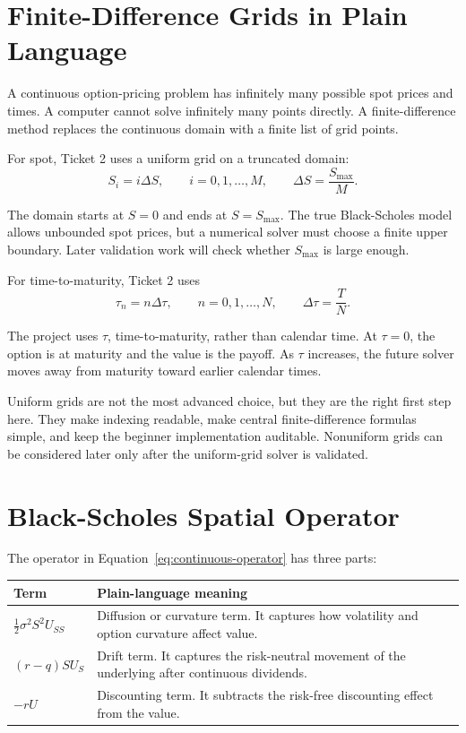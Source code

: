 \documentclass[11pt,a4paper]{article}
\begin{document}
\section{Finite-Difference Grids in Plain Language}

A continuous option-pricing problem has infinitely many possible spot prices and times. A
computer cannot solve infinitely many points directly. A finite-difference method replaces the
continuous domain with a finite list of grid points.

For spot, Ticket 2 uses a uniform grid on a truncated domain:
\begin{equation}
  S_i = i\Delta S,\qquad i = 0,1,\ldots,M,
  \qquad
  \Delta S = \frac{S_{\max}}{M}.
\end{equation}

The domain starts at \(S=0\) and ends at \(S=S_{\max}\). The true Black-Scholes model allows
unbounded spot prices, but a numerical solver must choose a finite upper boundary. Later
validation work will check whether \(S_{\max}\) is large enough.

For time-to-maturity, Ticket 2 uses
\begin{equation}
  \tau_n = n\Delta \tau,\qquad n = 0,1,\ldots,N,
  \qquad
  \Delta \tau = \frac{T}{N}.
\end{equation}

The project uses \(\tau\), time-to-maturity, rather than calendar time. At \(\tau=0\), the option
is at maturity and the value is the payoff. As \(\tau\) increases, the future solver moves away
from maturity toward earlier calendar times.

Uniform grids are not the most advanced choice, but they are the right first step here. They make
indexing readable, make central finite-difference formulas simple, and keep the beginner
implementation auditable. Nonuniform grids can be considered later only after the uniform-grid
solver is validated.

\section{Black-Scholes Spatial Operator}

The operator in Equation~\ref{eq:continuous-operator} has three parts:
\begin{longtable}{L{0.30\textwidth}L{0.58\textwidth}}
\toprule
Term & Plain-language meaning \\
\midrule
\endhead
\(\frac{1}{2}\sigma^2S^2U_{SS}\) &
Diffusion or curvature term. It captures how volatility and option curvature affect value. \\
\((r-q)SU_S\) &
Drift term. It captures the risk-neutral movement of the underlying after continuous dividends. \\
\(-rU\) &
Discounting term. It subtracts the risk-free discounting effect from the value. \\
\bottomrule
\end{longtable}
\end{document}
